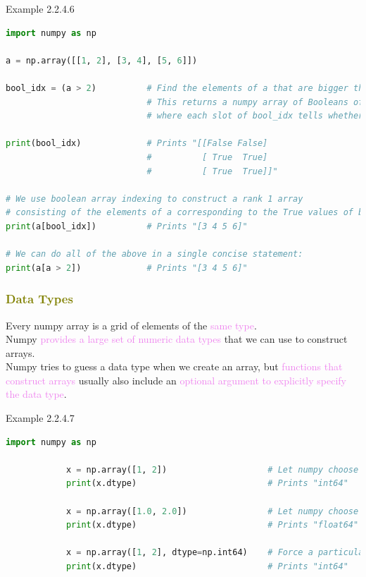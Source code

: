 \documentclass{book}
\begin{document}
\begin{egBox}{Example 2.2.4.6}{}
    \begin{lstlisting}[language=Python, basicstyle=\ttfamily\small, keywordstyle=\color{blue}, commentstyle=\color{forestgreen}, stringstyle=\color{red}, showstringspaces=false]
import numpy as np

a = np.array([[1, 2], [3, 4], [5, 6]])

bool_idx = (a > 2)          # Find the elements of a that are bigger than 2;
                            # This returns a numpy array of Booleans of the same shape as a,
                            # where each slot of bool_idx tells whether a > 2.

print(bool_idx)             # Prints "[[False False]
                            #          [ True  True]
                            #          [ True  True]]"

# We use boolean array indexing to construct a rank 1 array
# consisting of the elements of a corresponding to the True values of bool_idx
print(a[bool_idx])          # Prints "[3 4 5 6]"

# We can do all of the above in a single concise statement:
print(a[a > 2])             # Prints "[3 4 5 6]"
    \end{lstlisting}
\end{egBox}
\textcolor{olive}{\subsubsection{Data Types}}
Every numpy array is a grid of elements of the \textcolor{violet}{same type}.\\
Numpy \textcolor{violet}{provides a large set of numeric data types} that we can use to construct arrays.\\
Numpy tries to guess a data type when we create an array, but \textcolor{violet}{functions that construct arrays} usually also include an \textcolor{violet}{optional argument to explicitly specify the data type}.
\begin{egBox}{Example 2.2.4.7}{}
    \begin{lstlisting}[language=Python, basicstyle=\ttfamily\small, keywordstyle=\color{blue}, commentstyle=\color{forestgreen}, stringstyle=\color{red}, showstringspaces=false]
            import numpy as np

            x = np.array([1, 2])                    # Let numpy choose the datatype
            print(x.dtype)                          # Prints "int64"

            x = np.array([1.0, 2.0])                # Let numpy choose the datatype
            print(x.dtype)                          # Prints "float64"

            x = np.array([1, 2], dtype=np.int64)    # Force a particular datatype
            print(x.dtype)                          # Prints "int64"
    \end{lstlisting}
\end{egBox}
\end{document}
